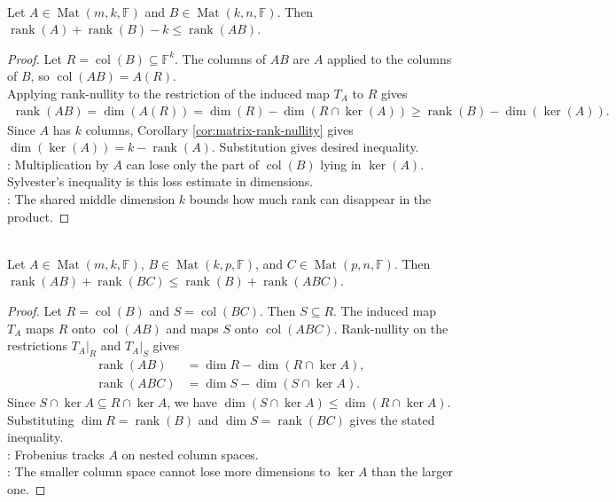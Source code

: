 \begin{theorem} \label{thm:sylvester-rank-inequality} \\
Let $A\in\operatorname{Mat}(m,k,\mathbb{F})$ and $B\in\operatorname{Mat}(k,n,\mathbb{F})$. Then $\operatorname{rank}(A)+\operatorname{rank}(B)-k\leq\operatorname{rank}(AB)$.
\begin{proof}
Let $R=\operatorname{col}(B)\subseteq\mathbb{F}^k$. The columns of $AB$ are $A$ applied to the columns of $B$, so $\operatorname{col}(AB)=A(R)$.\\
Applying rank-nullity to the restriction of the induced map $T_A$ to $R$ gives
\begin{align}
\operatorname{rank}(AB) =\dim(A(R)) =\dim(R)-\dim(R\cap\ker(A)) \geq \operatorname{rank}(B)-\dim(\ker(A)).
\nonumber
\end{align}
Since $A$ has $k$ columns, Corollary \ref{cor:matrix-rank-nullity} gives $\dim(\ker(A))=k-\operatorname{rank}(A)$. Substitution gives desired inequality.\\
: Multiplication by $A$ can lose only the part of $\operatorname{col}(B)$ lying in $\ker(A)$. Sylvester's inequality is this loss estimate in dimensions.\\
: The shared middle dimension $k$ bounds how much rank can disappear in the product.
\end{proof}
\end{theorem}

\begin{theorem} \label{thm:frobenius-rank-inequality} \\
Let $A\in\operatorname{Mat}(m,k,\mathbb{F})$, $B\in\operatorname{Mat}(k,p,\mathbb{F})$, and $C\in\operatorname{Mat}(p,n,\mathbb{F})$. Then $\operatorname{rank}(AB)+\operatorname{rank}(BC) \leq \operatorname{rank}(B)+\operatorname{rank}(ABC)$.
\begin{proof}
Let $R=\operatorname{col}(B)$ and $S=\operatorname{col}(BC)$. Then $S\subseteq R$. The induced map $T_A$ maps $R$ onto $\operatorname{col}(AB)$ and maps $S$ onto $\operatorname{col}(ABC)$. Rank-nullity on the restrictions $T_A|_R$ and $T_A|_S$ gives
\begin{align}
\operatorname{rank}(AB)&=\dim R-\dim(R\cap\ker A), \nonumber\\
\operatorname{rank}(ABC)&=\dim S-\dim(S\cap\ker A). \nonumber
\end{align}
Since $S\cap\ker A\subseteq R\cap\ker A$, we have $\dim(S\cap\ker A)\leq\dim(R\cap\ker A)$.\\
Substituting $\dim R=\operatorname{rank}(B)$ and $\dim S=\operatorname{rank}(BC)$ gives the stated inequality.\\
: Frobenius tracks $A$ on nested column spaces.\\
: The smaller column space cannot lose more dimensions to $\ker A$ than the larger one.
\end{proof}
\end{theorem}

